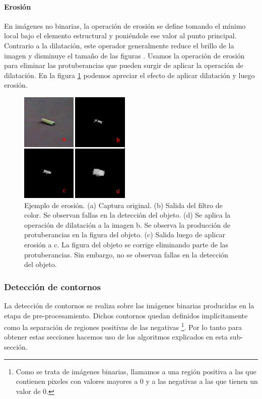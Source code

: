 	\paragraph{Erosi\'on}
En imágenes no binarias, la operación de erosión se define tomando el mínimo local bajo el elemento estructural y poniéndole ese valor al punto principal. Contrario a la dilatación, este operador generalmente reduce el brillo de la imagen y disminuye el tamaño de las figuras \cite{nasa-dilate-erode}. Usamos la operación de erosión para eliminar las protuberancias que pueden surgir de aplicar la operación de dilatación. En la figura \ref{fig:erode} podemos apreciar el efecto de aplicar dilatación y luego erosión.

\begin{figure}[tpb]
\begin{center}
  \includegraphics[scale=0.8]{figuras/erosion.png}
\end{center}
  \caption{\small Ejemplo de erosión. (a) Captura original. (b) Salida del filtro de color. Se observan fallas en la detección del objeto. (d) Se aplica la operación de dilatación a la imagen b. Se observa la producción de protuberancias en la figura del objeto. (c) Salida luego de aplicar erosión a c. La figura del objeto se corrige eliminando parte de las protuberancias. Sin embargo, no se observan fallas en la detección del objeto. }
  \label{fig:erode}
\end{figure}

	\subsubsection{Detección de contornos}
	La detección de contornos se realiza sobre las imágenes binarias producidas en la etapa de pre-procesamiento. Dichos contornos
	quedan definidos implícitamente como la separación de regiones 
	positivas de las negativas \footnote{ Como se trata de imágenes 
	binarias, llamamos a una región positiva a las que contienen 
	pixeles con valores mayores a 0 y a las negativas a las que tienen 
	un valor de 0.}. Por lo tanto para obtener estas secciones hacemos 
	uso de los algoritmos explicados en esta sub-sección.
	
